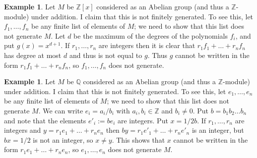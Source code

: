 \documentclass{amsart}
\newcommand{\Z}         {{\mathbb{Z}}}
\newcommand{\Q}         {{\mathbb{Q}}}
\renewcommand{\:}{\colon}
\theoremstyle{definition}
\newtheorem{example}[theorem]{Example}
\begin{document}
\begin{example}
 Let $M$ be $\Z[x]$ considered as an Abelian group (and thus a
 $\Z$-module) under addition.  I claim that this is not finitely
 generated.  To see this, let $f_1,\ldots,f_n$ be any finite list of
 elements of $M$; we need to show that this list does not generate
 $M$.  Let $d$ be the maximum of the degrees of the polynomials $f_i$,
 and put $g(x)=x^{d+1}$.  If $r_1,\ldots,r_n$ are integers then it is
 clear that $r_1f_1+\ldots+r_nf_n$ has degree at most $d$ and thus is
 not equal to $g$.  Thus $g$ cannot be written in the form
 $r_1f_1+\ldots+r_nf_n$, so $f_1,\ldots,f_n$ does not generate.
\end{example}
\begin{example}
 Let $M$ be $\Q$ considered as an Abelian group (and thus a
 $\Z$-module) under addition.  I claim that this is not finitely
 generated.  To see this, let $e_1,\ldots,e_n$ be any finite list of
 elements of $M$; we need to show that this list does not generate
 $M$.  We can write $e_i=a_i/b_i$ with $a_i,b_i\in\Z$ and
 $b_i\neq 0$.  Put $b=b_1b_2\ldots b_n$ and note that the elements
 $e'_i:=be_i$ are integers.  Put $x=1/2b$.  If $r_1,\ldots,r_n$ are
 integers and $y=r_1e_1+\ldots+r_ne_n$ then
 $by=r_1e'_1+\ldots+r_ne'_n$ is an integer, but $bx=1/2$ is not an
 integer, so $x\neq y$.  This shows that $x$ cannot be written in the
 form $r_1e_1+\ldots+r_ne_n$, so $e_1,\ldots,e_n$ does not generate
 $M$.  
\end{example}
\end{document}
